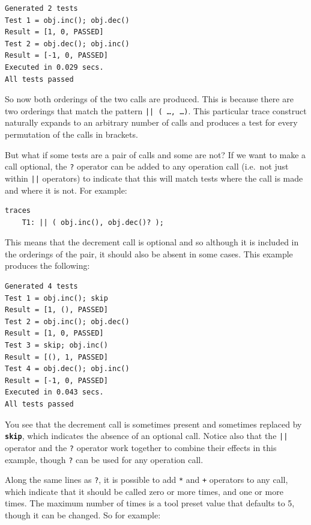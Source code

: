 \documentclass{overturerepchap}
\begin{document}
\small
\lstset{style=tool,language=}
\begin{lstlisting}[escapechar=@]
Generated 2 tests
Test 1 = obj.inc(); obj.dec()
Result = [1, 0, PASSED]
Test 2 = obj.dec(); obj.inc()
Result = [-1, 0, PASSED]
Executed in 0.029 secs. 
All tests passed
\end{lstlisting}
\lstset{style=mystyle}
\lstset{language=VDM++}
\normalsize

So now both orderings of the two calls are produced. This is because there are
two orderings that match the pattern \texttt{|| ( \ldots, \ldots )}. This
particular trace construct naturally expands to an arbitrary number of calls and
produces a test for every permutation of the calls in brackets.

But what if some tests are a pair of calls and some are not? If we want to make
a call optional, the \texttt{?} operator can be added to any operation call
(i.e.\ not just within \texttt{||} operators) to indicate that this will match
tests where the call is made and where it is not. For example:

\small
\begin{lstlisting}
traces
    T1: || ( obj.inc(), obj.dec()? );
\end{lstlisting}
\normalsize

This means that the decrement call is optional and so although it is included in
the orderings of the pair, it should also be absent in some cases. This
example produces the following:

\small
\lstset{style=tool,language=}
\begin{lstlisting}[escapechar=@]
Generated 4 tests
Test 1 = obj.inc(); skip
Result = [1, (), PASSED]
Test 2 = obj.inc(); obj.dec()
Result = [1, 0, PASSED]
Test 3 = skip; obj.inc()
Result = [(), 1, PASSED]
Test 4 = obj.dec(); obj.inc()
Result = [-1, 0, PASSED]
Executed in 0.043 secs. 
All tests passed
\end{lstlisting}
\lstset{style=mystyle}
\lstset{language=VDM++}
\normalsize

You see that the decrement call is sometimes present and sometimes replaced by
\texttt{\textbf{skip}}, which indicates the absence of an optional call. Notice also that
the \texttt{||} operator and the \texttt{?} operator work together to combine their
effects in this example, though \texttt{?} can be used for any operation call.

Along the same lines as \texttt{?}, it is possible to add \texttt{*} and
\texttt{+} operators to any call, which indicate that it should be called zero
or more times, and one or more times. The maximum number of times is a tool preset
value that defaults to 5, though it can be changed. So for example:
\end{document}
